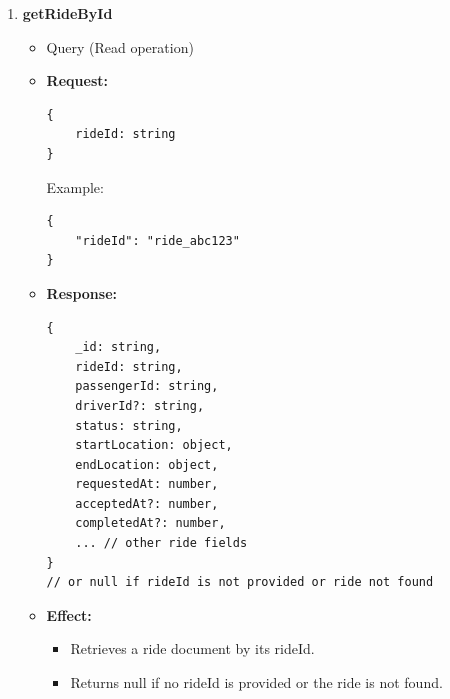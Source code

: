 \documentclass[a4paper,12pt]{article}
\begin{document}
\begin{enumerate}
    \item \textbf{getRideById}
    \begin{itemize}
        \item Query (Read operation)
        \item \textbf{Request:}
        \begin{verbatim}
{
    rideId: string
}
        \end{verbatim}
        Example:
        \begin{verbatim}
{
    "rideId": "ride_abc123"
}
        \end{verbatim}
        \item \textbf{Response:}
        \begin{verbatim}
{
    _id: string,
    rideId: string,
    passengerId: string,
    driverId?: string,
    status: string,
    startLocation: object,
    endLocation: object,
    requestedAt: number,
    acceptedAt?: number,
    completedAt?: number,
    ... // other ride fields
} 
// or null if rideId is not provided or ride not found
        \end{verbatim}
        \item \textbf{Effect:}
        \begin{itemize}
            \item Retrieves a ride document by its rideId.
            \item Returns null if no rideId is provided or the ride is not found.
        \end{itemize}
    \end{itemize}


\end{enumerate}
\end{document}
